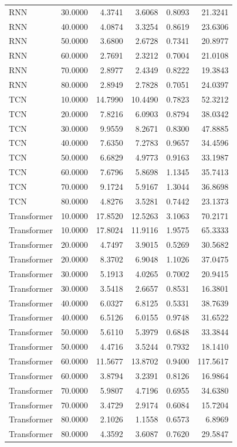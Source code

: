 \begin{tabular}{lrrrrr}
RNN & 30.0000 & 4.3741 & 3.6068 & 0.8093 & 21.3241 \\
RNN & 40.0000 & 4.0874 & 3.3254 & 0.8619 & 23.6306 \\
RNN & 50.0000 & 3.6800 & 2.6728 & 0.7341 & 20.8977 \\
RNN & 60.0000 & 2.7691 & 2.3212 & 0.7004 & 21.0108 \\
RNN & 70.0000 & 2.8977 & 2.4349 & 0.8222 & 19.3843 \\
RNN & 80.0000 & 2.8949 & 2.7828 & 0.7051 & 24.0397 \\
TCN & 10.0000 & 14.7990 & 10.4490 & 0.7823 & 52.3212 \\
TCN & 20.0000 & 7.8216 & 6.0903 & 0.8794 & 38.0342 \\
TCN & 30.0000 & 9.9559 & 8.2671 & 0.8300 & 47.8885 \\
TCN & 40.0000 & 7.6350 & 7.2783 & 0.9657 & 34.4596 \\
TCN & 50.0000 & 6.6829 & 4.9773 & 0.9163 & 33.1987 \\
TCN & 60.0000 & 7.6796 & 5.8698 & 1.1345 & 35.7413 \\
TCN & 70.0000 & 9.1724 & 5.9167 & 1.3044 & 36.8698 \\
TCN & 80.0000 & 4.8276 & 3.5281 & 0.7442 & 23.1373 \\
Transformer & 10.0000 & 17.8520 & 12.5263 & 3.1063 & 70.2171 \\
Transformer & 10.0000 & 17.8024 & 11.9116 & 1.9575 & 65.3333 \\
Transformer & 20.0000 & 4.7497 & 3.9015 & 0.5269 & 30.5682 \\
Transformer & 20.0000 & 8.3702 & 6.9048 & 1.1026 & 37.0475 \\
Transformer & 30.0000 & 5.1913 & 4.0265 & 0.7002 & 20.9415 \\
Transformer & 30.0000 & 3.5418 & 2.6657 & 0.8531 & 16.3801 \\
Transformer & 40.0000 & 6.0327 & 6.8125 & 0.5331 & 38.7639 \\
Transformer & 40.0000 & 6.5126 & 6.0155 & 0.9748 & 31.6522 \\
Transformer & 50.0000 & 5.6110 & 5.3979 & 0.6848 & 33.3844 \\
Transformer & 50.0000 & 4.4716 & 3.5244 & 0.7932 & 18.1410 \\
Transformer & 60.0000 & 11.5677 & 13.8702 & 0.9400 & 117.5617 \\
Transformer & 60.0000 & 3.8794 & 3.2391 & 0.8126 & 16.9864 \\
Transformer & 70.0000 & 5.9807 & 4.7196 & 0.6955 & 34.6380 \\
Transformer & 70.0000 & 3.4729 & 2.9174 & 0.6084 & 15.7204 \\
Transformer & 80.0000 & 2.1026 & 1.1558 & 0.6573 & 6.8969 \\
Transformer & 80.0000 & 4.3592 & 3.6087 & 0.7620 & 29.5847 \\
\bottomrule
\end{tabular}
